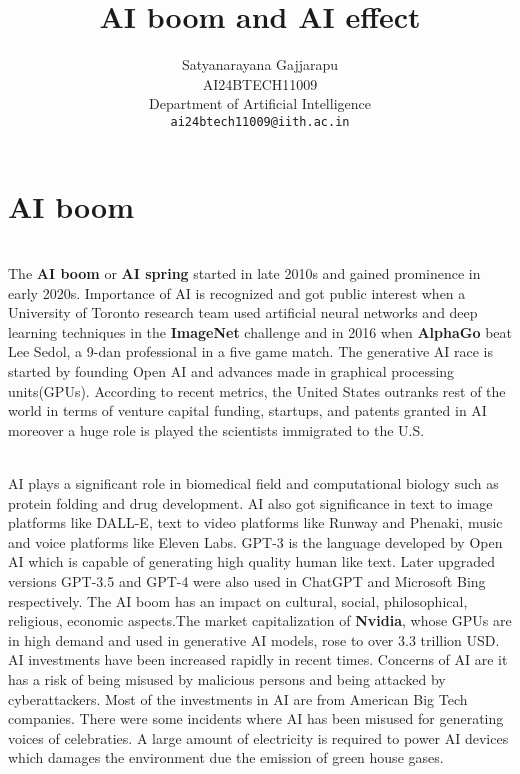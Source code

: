 \documentclass{article}
\title{AI boom and AI effect}
\author{%
Satyanarayana Gajjarapu \\
AI24BTECH11009 \\
Department of Artificial Intelligence \\
\texttt{ai24btech11009@iith.ac.in} \\
}
\begin{document}
\maketitle


\section{AI boom}
\begin{paragraph}
\\
The \textbf{AI boom} or \textbf{AI spring} started in late 2010s and gained prominence in early 2020s. Importance of AI is recognized and got public interest when a University of Toronto research team used artificial neural networks and deep learning techniques in the \textbf{ImageNet} challenge and in 2016 when \textbf{AlphaGo} beat Lee Sedol, a 9-dan professional in a five game match. The generative AI race is started by founding Open AI and advances made in graphical processing units(GPUs). According to recent metrics, the United States outranks rest of the world in terms of venture capital funding, startups, and patents granted in AI moreover a huge role is played the scientists immigrated to the U.S.
\end{paragraph}

\begin{paragraph}
\\
AI plays a significant role in biomedical field and computational biology such as protein folding and drug development. AI also got significance in text to image platforms like DALL-E, text to video platforms like Runway and Phenaki, music and voice platforms like Eleven Labs. GPT-3 is the language developed by Open AI which is capable of generating high quality human like text. Later upgraded versions GPT-3.5 and GPT-4 were also used in ChatGPT and Microsoft Bing respectively. The AI boom has an impact on cultural, social, philosophical, religious, economic aspects.The market capitalization of \textbf{Nvidia}, whose GPUs are in high demand and used in generative AI models, rose to over 3.3 trillion USD. AI investments have been increased rapidly in recent times. Concerns of AI are it has a risk of being misused by malicious persons and being attacked by cyberattackers. Most of the investments in AI are from American Big Tech companies. There were some incidents where AI has been misused for generating voices of celebraties. A large amount of electricity is required to power AI devices which damages the environment due the emission of green house gases.

\end{paragraph}
\end{document}
